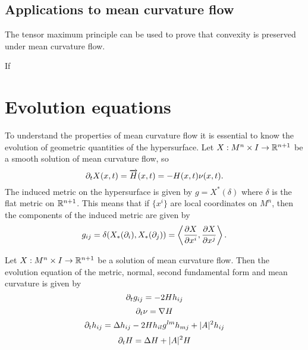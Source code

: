 \subsection{Applications to mean curvature flow}

The tensor maximum principle can be used to prove that convexity is preserved under mean curvature flow. 

\begin{lemma}
    If 
\end{lemma}
\section{Evolution equations}
To understand the properties of mean curvature flow it is essential to know the evolution of geometric quantities of the hypersurface. Let $X : M^n \times I \to \mathbb{R}^{n+1}$ be a smooth solution of mean curvature flow, so 
\[ \partial_t X(x,t) = \overrightarrow{H}(x,t)  = -H(x,t)\nu(x,t).\]
The induced metric on the hypersurface is given by $g = X^*(\delta)$ where $\delta$ is the flat metric on $\mathbb{R}^{n+1}$. This means that if $\{x^i\}$ are local coordinates on $M^n$, then the components of the induced metric are given by
\[ g_{ij} = \delta(X_*(\partial_i),X_*(\partial_j)) = \left\langle  \frac{\partial X}{\partial x^i}, \frac{\partial X}{\partial x^j} \right\rangle.  \]
\begin{lemma} Let $X: M^n \times I \to \mathbb{R}^{n+1}$ be a solution of mean curvature flow. Then the evolution equation of the metric, normal, second fundamental form and mean curvature is given by
\begin{equation}
    \partial_t g_{ij} = -2Hh_{ij}
\end{equation}
\begin{equation}
\partial_t \nu  = \nabla H
\end{equation}
\begin{equation}
\partial_t h_{ij} = \Delta h_{ij} - 2Hh_{il}g^{lm}h_{mj}+|A|^2h_{ij}
\end{equation}
\begin{equation}
    \partial_t H = \Delta H + |A|^2H \label{dtH}
\end{equation}
\end{lemma}
